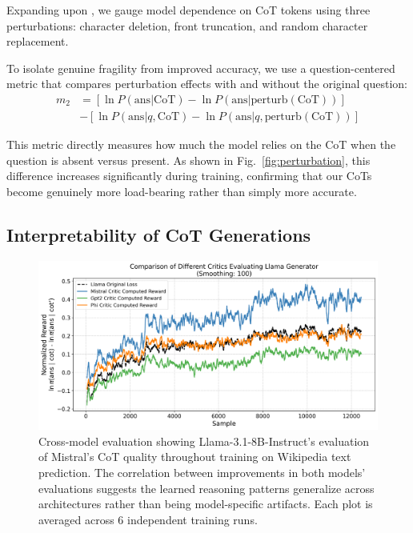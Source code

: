 \documentclass[letterpaper]{article} %
\begin{document}
Expanding upon \citet{lanham2023measuring}, we gauge model dependence on CoT tokens using three perturbations: character deletion, front truncation, and random character replacement.
    
To isolate genuine fragility from improved accuracy, we use a question-centered metric that compares perturbation effects with and without the original question:
\begin{align}
m_2 &= [\ln P(\text{ans}|\text{CoT}) - \ln P(\text{ans}|\text{perturb}(\text{CoT}))] \nonumber\\
&- [\ln P(\text{ans}|q, \text{CoT}) - \ln P(\text{ans}|q, \text{perturb}(\text{CoT}))]
\end{align}

This metric directly measures how much the model relies on the CoT when the question is absent versus present. As shown in Fig.~\ref{fig:perturbation}, this difference increases significantly during training, confirming that our CoTs become genuinely more load-bearing rather than simply more accurate.

\subsection{Interpretability of CoT Generations}
\label{subsec:interp}

\begin{figure}[ht]
  \centering
  \includegraphics[width=.9\textwidth]{Figures/wiki_multi_critic_comparison.png}
  \caption{Cross-model evaluation showing Llama-3.1-8B-Instruct's evaluation of Mistral's CoT quality throughout training on Wikipedia text prediction. The correlation between improvements in both models' evaluations suggests the learned reasoning patterns generalize across architectures rather than being model-specific artifacts. Each plot is averaged across 6 independent training runs.}
  \label{fig:cross_eval}
\end{figure}
\end{document}
